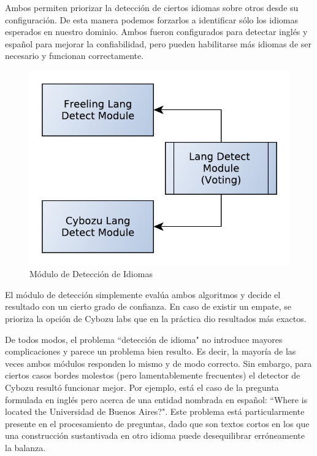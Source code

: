 Ambos permiten priorizar la detección de ciertos idiomas sobre otros desde su configuración.
De esta manera podemos forzarlos a identificar sólo los idiomas esperados en nuestro dominio. 
Ambos fueron configurados para detectar inglés y español para mejorar la confiabilidad,
pero pueden habilitarse más idiomas de ser necesario y funcionan correctamente. 

\begin{figure}
  \centering
    \includegraphics[scale=0.5]{graficos/LangDetect}
  \caption{Módulo de Detección de Idiomas}
  \label{fig:LangDetect}
\end{figure}


El módulo de detección simplemente evalúa ambos algoritmos y 
decide el resultado con un cierto grado de confianza. En caso de existir un empate, se 
prioriza la opción de Cybozu labs que en la práctica dio resultados más exactos.

De todos modos, el problema ``detección de idioma" no introduce mayores complicaciones y parece un problema bien resulto.
Es decir, la mayoría de las veces ambos módulos responden lo mismo y de modo correcto.
Sin embargo, para ciertos casos bordes molestos (pero lamentablemente frecuentes)
el detector de Cybozu resultó funcionar mejor. Por ejemplo, está el caso de la pregunta formulada en inglés pero acerca de una entidad nombrada en español: 
``Where is located the Universidad de Buenos Aires?". Este problema está particularmente presente en el procesamiento de preguntas, dado que son textos cortos en los que una construcción sustantivada en otro idioma puede desequilibrar erróneamente la balanza. 

